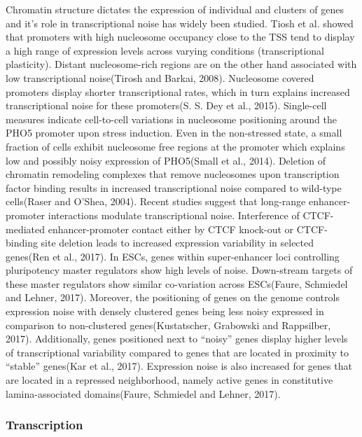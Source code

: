 Chromatin structure dictates the expression of individual and clusters of genes and it’s role in transcriptional noise has widely been studied. Tiosh et al. showed that promoters with high nucleosome occupancy close to the TSS tend to display a high range of expression levels across varying conditions (transcriptional plasticity). Distant nucleosome-rich regions are on the other hand associated with low transcriptional noise(Tirosh and Barkai, 2008). Nucleosome covered promoters display shorter transcriptional rates, which in turn explains increased transcriptional noise for these promoters(S. S. Dey et al., 2015). Single-cell measures indicate cell-to-cell variations in nucleosome positioning around the PHO5 promoter upon stress induction. Even in the non-stressed state, a small fraction of cells exhibit nucleosome free regions at the promoter which explains low and possibly noisy expression of PHO5(Small et al., 2014). Deletion of chromatin remodeling complexes that remove nucleosomes upon transcription factor binding results in increased transcriptional noise compared to wild-type cells(Raser and O’Shea, 2004). 
Recent studies suggest that long-range enhancer-promoter interactions modulate transcriptional noise. Interference of CTCF-mediated enhancer-promoter contact either by CTCF knock-out or CTCF-binding site deletion leads to increased expression variability in selected genes(Ren et al., 2017).  In ESCs, genes within super-enhancer loci controlling pluripotency master regulators show high levels of noise. Down-stream targets of these master regulators show similar co-variation across ESCs(Faure, Schmiedel and Lehner, 2017).
Moreover, the positioning of genes on the genome controls expression noise with densely clustered genes being less noisy expressed in comparison to non-clustered genes(Kustatscher, Grabowski and Rappsilber, 2017). Additionally, genes positioned next to “noisy” genes display higher levels of transcriptional variability compared to genes that are located in proximity to “stable” genes(Kar et al., 2017). Expression noise is also increased for genes that are located in a repressed neighborhood, namely active genes in constitutive lamina-associated domains(Faure, Schmiedel and Lehner, 2017). 

\subsubsection{Transcription}

